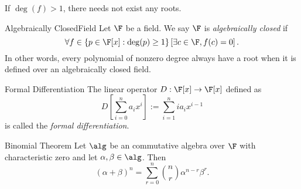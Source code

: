 \documentclass[math_245.tex]{subfiles}
\begin{document}
    \begin{remark}
        If $\deg(f)>1$, there needs not exist any roots.
    \end{remark}

    \begin{definition}{Algebraically Closed}{Field}
        Let $\F$ be a field. We say $\F$ is \emph{algebraically closed} if
        \begin{equation*}
            \forall f\in \left\lbrace p\in\F[x]: \deg(p)\geq 1 \right\rbrace \left[ \exists c\in \F, f(c) = 0 \right]. 
        \end{equation*}
        In other words, every polynomial of nonzero degree always have a root when it is defined over an algebraically closed field.
    \end{definition}

    \begin{definition}{Formal Differentiation}{}
        The linear operator $D: \F[x]\to \F[x]$ defined as
        \begin{equation*}
            D \left[ \sum^n_{i=0} a_ix^i \right] := \sum^n_{i=1} ia_ix^{i-1} 
        \end{equation*}
        is called the \emph{formal differentiation}.
    \end{definition}

    \begin{theorem}{Binomial Theorem}
        Let $\alg$ be an commutative algebra over $\F$ with characteristic zero and let $\alpha, \beta \in \alg$. Then
        \begin{equation*}
            (\alpha + \beta)^n = \sum^n_{r=0} \binom{n}{r} \alpha^{n-r}\beta^r.
        \end{equation*}
    \end{theorem}
\end{document}
